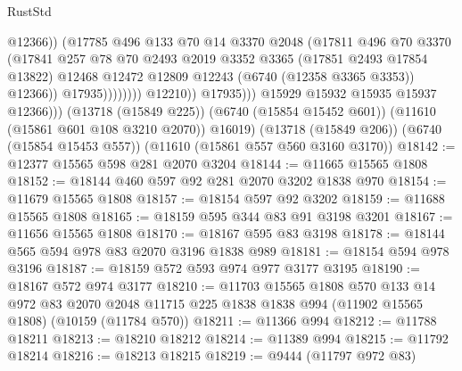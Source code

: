 \begin{lexlean}{RustStd}
\begin{coremodule}
                                        @12366))
                                    (@17785
                                      @496
                                      @133
                                      @70
                                      @14
                                      @3370
                                      @2048
                                      (@17811
                                        @496
                                        @70
                                        @3370
                                        (@17841
                                          @257
                                          @78
                                          @70
                                          @2493
                                          @2019
                                          @3352
                                          @3365
                                          (@17851 @2493 @17854 @13822)
                                          @12468
                                          @12472
                                          @12809
                                          @12243
                                          (@6740 (@12358 @3365 @3353))
                                          @12366))
                                      @17935))))))))
                      @12210))
                  @17935)))
            @15929
            @15932
            @15935
            @15937
            @12366)))
      (@13718 (@15849 @225))
      (@6740 (@15854 @15452 @601))
      (@11610 (@15861 @601 @108 @3210 @2070))
      @16019)
    (@13718 (@15849 @206))
    (@6740 (@15854 @15453 @557))
    (@11610 (@15861 @557 @560 @3160 @3170))
@18142 := @12377 @15565 @598 @281 @2070 @3204
@18144 := @11665 @15565 @1808
@18152 := @18144 @460 @597 @92 @281 @2070 @3202 @1838 @970
@18154 := @11679 @15565 @1808
@18157 := @18154 @597 @92 @3202
@18159 := @11688 @15565 @1808
@18165 := @18159 @595 @344 @83 @91 @3198 @3201
@18167 := @11656 @15565 @1808
@18170 := @18167 @595 @83 @3198
@18178 := @18144 @565 @594 @978 @83 @2070 @3196 @1838 @989
@18181 := @18154 @594 @978 @3196
@18187 := @18159 @572 @593 @974 @977 @3177 @3195
@18190 := @18167 @572 @974 @3177
@18210 := @11703
    @15565
    @1808
    @570
    @133
    @14
    @972
    @83
    @2070
    @2048
    @11715
    @225
    @1838
    @1838
    @994
    (@11902 @15565 @1808)
    (@10159 (@11784 @570))
@18211 := @11366 @994
@18212 := @11788 @18211
@18213 := @18210 @18212
@18214 := @11389 @994
@18215 := @11792 @18214
@18216 := @18213 @18215
@18219 := @9444 (@11797 @972 @83)

\end{coremodule}
\end{lexlean}
